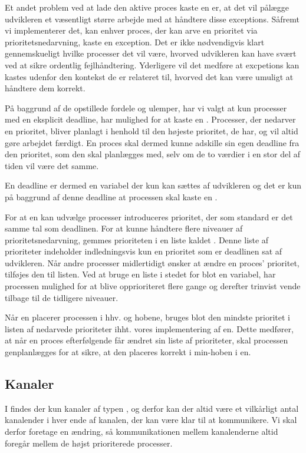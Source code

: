 Et andet problem ved at lade den aktive proces kaste en  er, at det vil pålægge udvikleren et væsentligt større arbejde med at håndtere disse exceptions. Såfremt vi implementerer det, kan enhver proces, der kan arve en prioritet via prioritetsnedarvning, kaste en exception. Det er ikke nødvendigvis klart gennemskueligt hvilke processer det vil være, hvorved udvikleren kan have svært ved at sikre ordentlig fejlhåndtering. Yderligere vil det medføre at excpetions kan kastes udenfor den kontekst de er relateret til, hvorved det kan være umuligt at håndtere dem korrekt.  

På baggrund af de opstillede fordele og ulemper, har vi valgt at kun processer med en eksplicit deadline, har mulighed for at kaste en . Processer, der nedarver en prioritet, bliver planlagt i henhold til den højeste prioritet, de har, og vil altid  gøre arbejdet færdigt. En proces skal dermed kunne adskille sin egen deadline fra den prioritet, som den skal planlægges med, selv om de to værdier i en stor del af tiden vil være det samme.

En deadline er dermed en variabel der kun kan sættes af udvikleren og det er kun på baggrund af denne deadline at  processen skal kaste en .

For at  \sched en kan udvælge processer introduceres prioritet, der som standard er det samme tal som deadlinen. For at kunne håndtere flere niveauer af prioritetsnedarvning,  gemmes prioriteten i en  liste kaldet . Denne liste af prioriteter  indeholder indledningsvis kun en prioritet som er deadlinen sat af udvikleren. Når andre processer  midlertidigt ønsker at ændre en proces' prioritet, tilføjes den til listen. Ved at bruge en liste i stedet for blot en variabel, har processen mulighed for at blive opprioriteret flere gange og derefter trinvist vende tilbage til de tidligere niveauer.

Når \sched en placerer processen i hhv.  og  hobene, bruges blot den mindste prioritet i listen af nedarvede prioriteter ihht. vores implementering af \sched en. Dette medfører, at når en proces efterfølgende  får ændret sin liste af prioriteter, skal processen genplanlægges for at sikre, at den placeres korrekt i min-hoben i \sched en. 

\subsection{Kanaler}
I \pycsp findes der kun kanaler af typen , og derfor kan der altid  være et vilkårligt antal kanalender i hver ende af kanalen, der kan være klar til at kommunikere. Vi skal derfor foretage en ændring, så kommunikationen mellem kanalenderne altid foregår mellem de højst prioriterede processer. 

